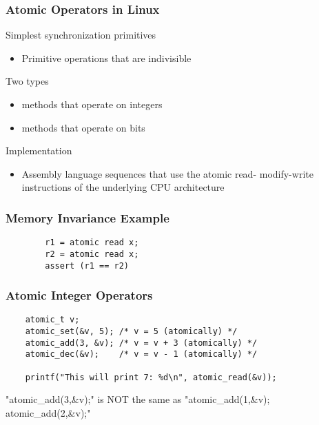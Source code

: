 \begin{frame}[fragile]
    \frametitle{Atomic Operators in Linux}
    \Large
    Simplest synchronization primitives
    \normalsize
    \begin{itemize}
        \item Primitive operations that are indivisible
    \end{itemize}
    \Large
    Two types
    \normalsize
\begin{itemize}
    \item methods that operate on integers
    \item  methods that operate on bits
\end{itemize}    

    \Large
Implementation

\normalsize
\begin{itemize}
    \item Assembly language sequences that use the atomic read-
    modify-write instructions of the underlying CPU
    architecture
    
\end{itemize}

\end{frame}


\begin{frame}[fragile]
    \frametitle{Memory Invariance Example  }
    \large    
    \begin{block}{}
        \begin{verbatim}
        r1 = atomic read x;
        r2 = atomic read x;
        assert (r1 == r2)
        \end{verbatim}
    \end{block}    
\end{frame}


\begin{frame}[fragile]
    \frametitle{Atomic Integer Operators }
    \large    
    \begin{block}{}
        \begin{verbatim}
    atomic_t v;
    atomic_set(&v, 5); /* v = 5 (atomically) */
    atomic_add(3, &v); /* v = v + 3 (atomically) */
    atomic_dec(&v);    /* v = v - 1 (atomically) */
    
    printf("This will print 7: %d\n", atomic_read(&v));
        \end{verbatim}
    \end{block}    
 "atomic\_add(3,\&v);"  is NOT the same as "atomic\_add(1,\&v); atomic\_add(2,\&v);"
 
\end{frame}


